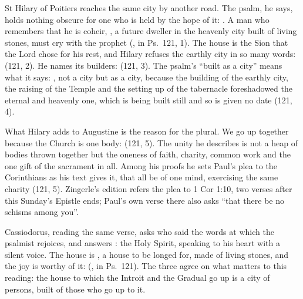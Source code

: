 St Hilary of Poitiers reaches the same city by another road. The psalm, he
says, holds nothing obscure for one who is held by the hope of it: . A man
who remembers that he is coheir, , a future dweller in the heavenly city built of
living stones, must cry with the prophet  (, in Ps.~121, 1). The house is the
Sion that the Lord chose for his rest, and Hilary refuses the earthly city in
so many words:  (121, 2). He names its
builders:  (121, 3). The psalm's ``built as a
city'' means what it says: , not a city
but as a city, because the building of the earthly city, the raising of the
Temple and the setting up of the tabernacle foreshadowed the eternal and
heavenly one, which is being built still and so is given no date (121, 4).

What Hilary adds to Augustine is the reason for the plural. We go up together
because the Church is one body:  (121, 5). The unity he describes is not a
heap of bodies thrown together but the oneness of faith, charity, common work
and the one gift of the sacrament in all. Among his proofs he sets Paul's plea
to the Corinthians as his text gives it, that all be of one mind, exercising
the same charity (121, 5). Zingerle's edition refers the plea to 1 Cor 1:10,
two verses after this Sunday's Epistle ends; Paul's own verse there also asks
``that there be no schisms among you''.

Cassiodorus, reading the same verse, asks who said the words at which the
psalmist rejoices, and answers : the Holy Spirit, speaking to his heart with a silent
voice. The house is , a house to be longed for, made of living stones, and the joy is
worthy of it:  (, in Ps.~121). The three
agree on what matters to this reading: the house to which the Introit and the
Gradual go up is a city of persons, built of those who go up to it.

